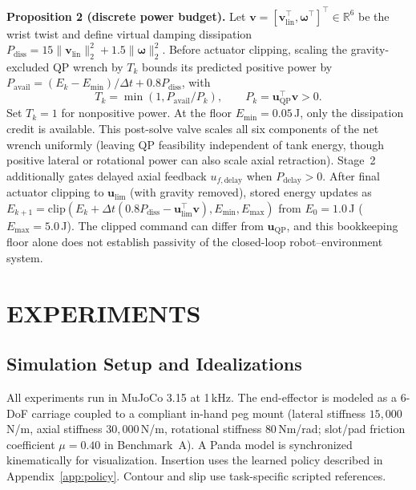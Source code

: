 \documentclass[letterpaper,10pt,conference]{IEEEtran}
\begin{document}
\textbf{Proposition 2 (discrete power budget).} Let $\mathbf{v}=[\mathbf{v}_{\mathrm{lin}}^\top,\boldsymbol{\omega}^\top]^\top\in\mathbb{R}^6$ be the wrist twist and define virtual damping dissipation $P_{\mathrm{diss}}=15\|\mathbf{v}_{\mathrm{lin}}\|_2^2+1.5\|\boldsymbol{\omega}\|_2^2$. Before actuator clipping, scaling the gravity-excluded QP wrench by $T_k$ bounds its predicted positive power by $P_{\mathrm{avail}}=(E_k-E_{\min})/\Delta t+0.8P_{\mathrm{diss}}$, with
\begin{equation}
T_k=\min(1,P_{\mathrm{avail}}/P_k),\qquad
P_k=\mathbf u_{\mathrm{QP}}^\top\mathbf v>0.
\end{equation}
Set $T_k=1$ for nonpositive power. At the floor $E_{\min}=0.05$\,J, only the dissipation credit is available. This post-solve valve scales all six components of the net wrench uniformly (leaving QP feasibility independent of tank energy, though positive lateral or rotational power can also scale axial retraction). Stage~2 additionally gates delayed axial feedback $u_{f,\mathrm{delay}}$ when $P_{\mathrm{delay}}>0$. After final actuator clipping to $\mathbf{u}_{\mathrm{lim}}$ (with gravity removed), stored energy updates as $E_{k+1}=\mathrm{clip}(E_k+\Delta t(0.8P_{\mathrm{diss}}-\mathbf{u}_{\mathrm{lim}}^\top\mathbf{v}),E_{\min},E_{\max})$ from $E_0=1.0$\,J ($E_{\max}=5.0$\,J). The clipped command can differ from $\mathbf{u}_{\mathrm{QP}}$, and this bookkeeping floor alone does not establish passivity of the closed-loop robot--environment system.

\section{EXPERIMENTS}
\label{sec:exp}

\subsection{Simulation Setup and Idealizations}
All experiments run in MuJoCo 3.15 at 1\,kHz. The end-effector is modeled as a 6-DoF carriage coupled to a compliant in-hand peg mount (lateral stiffness $15{,}000$\,N/m, axial stiffness $30{,}000$\,N/m, rotational stiffness $80$\,Nm/rad; slot/pad friction coefficient $\mu=0.40$ in Benchmark~A). A Panda model is synchronized kinematically for visualization. Insertion uses the learned policy described in Appendix~\ref{app:policy}. Contour and slip use task-specific scripted references.
\end{document}
